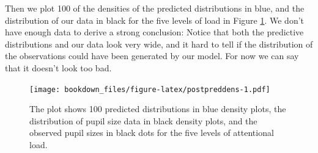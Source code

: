 \documentclass[12pt,]{krantz}
\newenvironment{Shaded}{\begin{snugshade}}{\end{snugshade}}
\newcommand{\KeywordTok}[1]{\textcolor[rgb]{0.13,0.29,0.53}{\textbf{#1}}}
\newcommand{\DataTypeTok}[1]{\textcolor[rgb]{0.13,0.29,0.53}{#1}}
\newcommand{\DecValTok}[1]{\textcolor[rgb]{0.00,0.00,0.81}{#1}}
\newcommand{\FloatTok}[1]{\textcolor[rgb]{0.00,0.00,0.81}{#1}}
\newcommand{\StringTok}[1]{\textcolor[rgb]{0.31,0.60,0.02}{#1}}
\newcommand{\OtherTok}[1]{\textcolor[rgb]{0.56,0.35,0.01}{#1}}
\newcommand{\OperatorTok}[1]{\textcolor[rgb]{0.81,0.36,0.00}{\textbf{#1}}}
\newcommand{\NormalTok}[1]{#1}
\theoremstyle{definition}
\theoremstyle{definition}
\theoremstyle{definition}
\theoremstyle{remark}
\begin{document}
Then we plot 100 of the densities of the predicted distributions in
blue, and the distribution of our data in black for the five levels of
load in Figure \ref{fig:postpreddens}. We don't have enough data to
derive a strong conclusion: Notice that both the predictive
distributions and our data look very wide, and it hard to tell if the
distribution of the observations could have been generated by our model.
For now we can say that it doesn't look too bad.






\begin{Shaded}
\end{Shaded}

\begin{figure}
\centering
\texttt{[image: bookdown\_files/figure-latex/postpreddens-1.pdf]}
\caption{\label{fig:postpreddens}The plot shows 100 predicted distributions in blue
density plots, the distribution of pupil size data in black density
plots, and the observed pupil sizes in black dots for the five levels of
attentional load.}
\end{figure}
\end{document}
